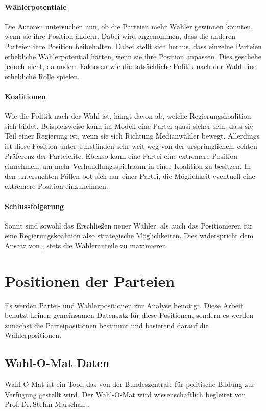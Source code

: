 \paragraph{Wählerpotentiale}
Die Autoren untersuchen nun, ob die Parteien mehr Wähler gewinnen könnten, wenn sie ihre Position ändern.
Dabei wird angenommen, dass die anderen Parteien ihre Position beibehalten.
Dabei stellt sich heraus, dass einzelne Parteien erhebliche Wählerpotential hätten, wenn sie ihre Position anpassen.
Dies geschehe jedoch nicht, da andere Faktoren wie die tatsächliche Politik nach der Wahl eine erhebliche Rolle spielen.
\citep[S.\,276-277]{schofield1998germany}

\paragraph{Koalitionen}
Wie die Politik nach der Wahl ist, hängt davon ab, welche Regierungskoalition sich bildet. Beispielsweise kann im Modell eine Partei quasi sicher sein, dass sie Teil einer Regierung ist, wenn sie sich Richtung Medianwähler bewegt. Allerdings ist diese Position unter Umständen sehr weit weg von der ursprünglichen, echten Präferenz der Parteielite.
Ebenso kann eine Partei eine extremere Position einnehmen, um mehr Verhandlungsspielraum in einer Koalition zu besitzen.
In den untersuchten Fällen bot sich nur einer Partei, die Möglichkeit eventuell eine extremere Position einzunehmen. \citep[S.\,277-281]{schofield1998germany}

\paragraph{Schlussfolgerung}
Somit sind sowohl das Erschließen neuer Wähler, als auch das Positionieren für eine Regierungskoalition also strategische Möglichkeiten. Dies widerspricht dem Ansatz von \citet{downs1957economic}, stets die Wähleranteile zu maximieren. \citep[S.\,282-283]{schofield1998germany}

\section{Positionen der Parteien}\label{Sec-Parteienpositionen}

Es werden Partei- und Wählerpositionen zur Analyse benötigt. Diese Arbeit benutzt keinen gemeinsamen Datensatz für diese Positionen, sondern es werden zunächst die Parteipositionen bestimmt und basierend darauf die Wählerpositionen.

\subsection{Wahl-O-Mat Daten}
Wahl-O-Mat \citep{WahlOMat} ist ein Tool, das von der Bundeszentrale für politische Bildung zur Verfügung gestellt wird. Der Wahl-O-Mat wird wissenschaftlich begleitet von Prof.\,Dr.\,Stefan Marschall \citep{MarschallWahlOMat}.

